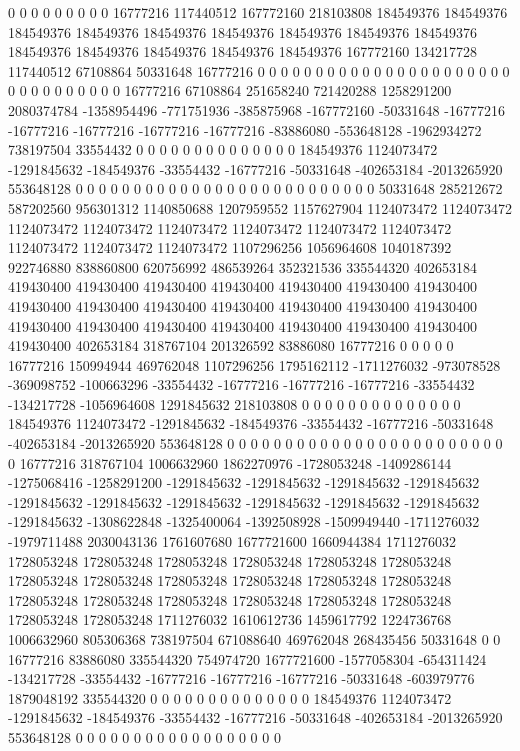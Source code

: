 0 0 0 0 0 0 0 0 0 16777216 117440512 167772160 218103808 184549376 184549376 184549376 184549376 184549376 184549376 184549376 184549376 184549376 184549376 184549376 184549376 184549376 184549376 167772160 134217728 117440512 67108864 50331648 16777216 0 0 0 0 0 0 0 0 0 0 0 0 0 0 0 0 0 0 0 0 0 0 0 0 0 0 0 0 0 0 0 0 16777216 67108864 251658240 721420288 1258291200 2080374784 -1358954496 -771751936 -385875968 -167772160 -50331648 -16777216 -16777216 -16777216 -16777216 -16777216 -83886080 -553648128 -1962934272 738197504 33554432 0 0 0 0 0 0 0 0 0 0 0 0 0 0 184549376 1124073472 -1291845632 -184549376 -33554432 -16777216 -50331648 -402653184 -2013265920 553648128 0 0 0 0 0 0 0 0 0 0 0 0 0 0 0 0 0 0
0 0 0 0 0 0 0 0 50331648 285212672 587202560 956301312 1140850688 1207959552 1157627904 1124073472 1124073472 1124073472 1124073472 1124073472 1124073472 1124073472 1124073472 1124073472 1124073472 1124073472 1107296256 1056964608 1040187392 922746880 838860800 620756992 486539264 352321536 335544320 402653184 419430400 419430400 419430400 419430400 419430400 419430400 419430400 419430400 419430400 419430400 419430400 419430400 419430400 419430400 419430400 419430400 419430400 419430400 419430400 419430400 419430400 419430400 402653184 318767104 201326592 83886080 16777216 0 0 0 0 0 16777216 150994944 469762048 1107296256 1795162112 -1711276032 -973078528 -369098752 -100663296 -33554432 -16777216 -16777216 -16777216 -33554432 -134217728 -1056964608 1291845632 218103808 0 0 0 0 0 0 0 0 0 0 0 0 0 0 184549376 1124073472 -1291845632 -184549376 -33554432 -16777216 -50331648 -402653184 -2013265920 553648128 0 0 0 0 0 0 0 0 0 0 0 0 0 0 0 0 0 0
0 0 0 0 0 0 0 16777216 318767104 1006632960 1862270976 -1728053248 -1409286144 -1275068416 -1258291200 -1291845632 -1291845632 -1291845632 -1291845632 -1291845632 -1291845632 -1291845632 -1291845632 -1291845632 -1291845632 -1291845632 -1308622848 -1325400064 -1392508928 -1509949440 -1711276032 -1979711488 2030043136 1761607680 1677721600 1660944384 1711276032 1728053248 1728053248 1728053248 1728053248 1728053248 1728053248 1728053248 1728053248 1728053248 1728053248 1728053248 1728053248 1728053248 1728053248 1728053248 1728053248 1728053248 1728053248 1728053248 1728053248 1711276032 1610612736 1459617792 1224736768 1006632960 805306368 738197504 671088640 469762048 268435456 50331648 0 0 16777216 83886080 335544320 754974720 1677721600 -1577058304 -654311424 -134217728 -33554432 -16777216 -16777216 -16777216 -50331648 -603979776 1879048192 335544320 0 0 0 0 0 0 0 0 0 0 0 0 0 0 184549376 1124073472 -1291845632 -184549376 -33554432 -16777216 -50331648 -402653184 -2013265920 553648128 0 0 0 0 0 0 0 0 0 0 0 0 0 0 0 0 0 0

